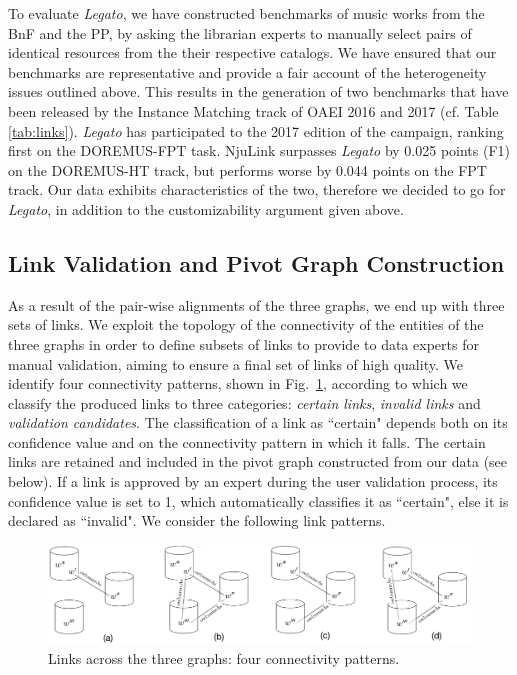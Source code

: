 To evaluate {\it Legato}, we have constructed benchmarks of music works from the BnF and the PP, by asking the librarian experts to manually select pairs of identical resources from the their respective catalogs. We have ensured that our benchmarks are representative and provide a fair account of the heterogeneity issues outlined above. This results in the generation of two  benchmarks  that have been released by the Instance Matching track of OAEI 2016 and 2017 (cf. Table \ref{tab:links}). {\it Legato} has participated to the 2017 edition of the campaign, ranking first on the DOREMUS-FPT task. NjuLink surpasses {\it Legato} by 0.025 points (F1) on the DOREMUS-HT track, but performs worse by 0.044 points on the FPT track. Our data exhibits characteristics of the two, therefore we decided to go for {\it Legato}, in addition to the customizability argument given above.  

\subsection{ Link Validation and Pivot Graph Construction} \label{sec:pivot}
As a result of the pair-wise alignments of the three graphs, we end up with three sets of links. We exploit the topology of the connectivity of the entities of the three graphs in order to define subsets of links to provide to data experts for manual validation, aiming to ensure a final set of links of high quality. We identify four connectivity patterns, shown in Fig.~\ref{fig:cases}, according to which we classify the produced links to three categories: {\it certain links}, {\it invalid links} and {\it validation candidates}. The classification of a link as ``certain" depends both on its confidence value and on the connectivity pattern in which it falls. The certain links are retained and included in the pivot graph constructed from our data (see below). If a link is approved by an expert during the user validation process, its confidence value is set to 1, which automatically classifies it as ``certain", else it is declared as ``invalid". We consider the following link patterns.

\begin{figure} 
\center
	\includegraphics[width=12cm]{img/links-cases.png}
	\caption{Links across the three graphs: four connectivity patterns.}
	\label{fig:cases}
\end{figure}

